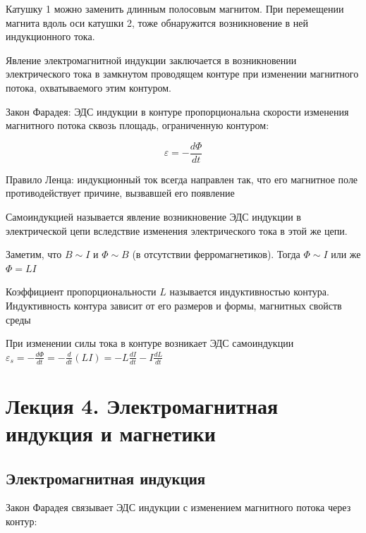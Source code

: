 \documentclass[12pt]{article}
\begin{document}
Катушку 1 можно заменить длинным полосовым магнитом. При перемещении магнита вдоль оси катушки 2, тоже обнаружится возникновение в ней 
индукционного тока.

Явление электромагнитной индукции заключается в возникновении электрического тока в замкнутом проводящем
контуре при изменении магнитного потока, охватываемого этим контуром. 

\begin{MyTheorem}
    Закон Фарадея: ЭДС индукции в контуре пропорциональна скорости изменения магнитного потока сквозь площадь, 
    ограниченную контуром:

    \[\varepsilon = - \frac{d\Phi}{dt}\]
\end{MyTheorem}

\begin{MyTheorem}
    Правило Ленца: индукционный ток всегда направлен так, что его магнитное поле противодействует причине, вызвавшей его появление
\end{MyTheorem}

Самоиндукцией называется явление возникновение ЭДС индукции в электрической цепи вследствие
изменения электрического тока в этой же цепи.

Заметим, что $B \sim I$ и $\Phi \sim B$ (в отсутствии ферромагнетиков). Тогда $\Phi \sim I$ или же $\Phi = LI$

Коэффициент пропорциональности $L$ называется индуктивностью контура. Индуктивность контура зависит от его размеров
и формы, магнитных свойств среды

При изменении силы тока в контуре возникает ЭДС самоиндукции $\varepsilon_s = -\frac{d\Phi}{dt} = -\frac{d}{dt}(LI) = -L\frac{dI}{dt} - I\frac{dL}{dt}$

\clearpage








\section{Лекция 4. Электромагнитная индукция и магнетики}

\subsection{Электромагнитная индукция}

Закон Фарадея связывает ЭДС индукции с изменением магнитного потока через контур:
\end{document}
